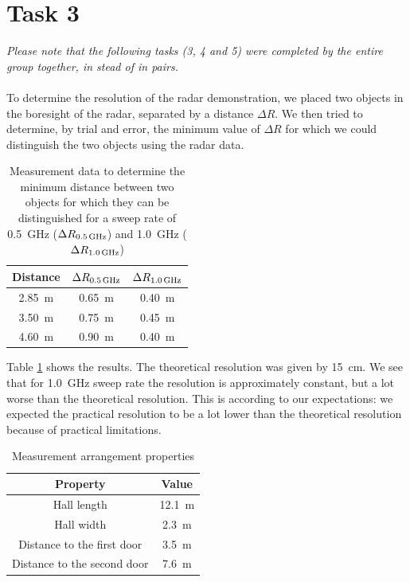 \documentclass[11pt,titlepage]{report}
\begin{document}
\section{Task 3}
\emph{Please note that the following tasks (3, 4 and 5) were completed by the entire group together, in stead of in pairs.} 
\\\\
To determine the resolution of the radar demonstration, we placed two objects in the boresight of the radar, separated by a distance $\Delta R$. We then tried to determine, by trial and error, the minimum value of $\Delta R$ for which we could distinguish the two objects using the radar data.

\begin{table}[H]
	\centering
	\caption{Measurement data to determine the minimum distance between two objects for which they can be distinguished for a sweep rate of \SI{0.5}{GHz} ($\Delta R_{\text{\SI{0.5}{GHz}}}$) and \SI{1.0}{GHz} ($\Delta R_{\text{\SI{1.0}{GHz}}}$)}
	\label{tab:ass-2-dist-obj}
	\begin{tabular}{c c c}
		\hline\hline
		Distance & $\Delta R_{\text{\SI{0.5}{GHz}}}$ & $\Delta R_{\text{\SI{1.0}{GHz}}}$ \\
		\hline
		\SI{2.85}{m} & \SI{0.65}{m} & \SI{0.40}{m} \\
		\SI{3.50}{m} & \SI{0.75}{m} & \SI{0.45}{m} \\
		\SI{4.60}{m} & \SI{0.90}{m} & \SI{0.40}{m} \\
		\hline
	\end{tabular}
\end{table}

Table \ref{tab:ass-2-dist-obj} shows the results. The theoretical resolution was given by \SI{15}{cm}. We see that for \SI{1.0}{GHz} sweep rate the resolution is approximately constant, but a lot worse than the theoretical resolution. This is according to our expectations: we expected the practical resolution to be a lot lower than the theoretical resolution because of practical limitations.

\begin{table}[H]
	\centering
	\caption{Measurement arrangement properties}
	\label{tab:ass-2-arr}
	\begin{tabular}{c c}
		\hline\hline
		Property & Value \\
		\hline
		Hall length & \SI{12.1}{m} \\
		Hall width & \SI{2.3}{m} \\
		Distance to the first door & \SI{3.5}{m} \\
		Distance to the second door & \SI{7.6}{m} \\
		\hline
	\end{tabular}
\end{table}
\end{document}
